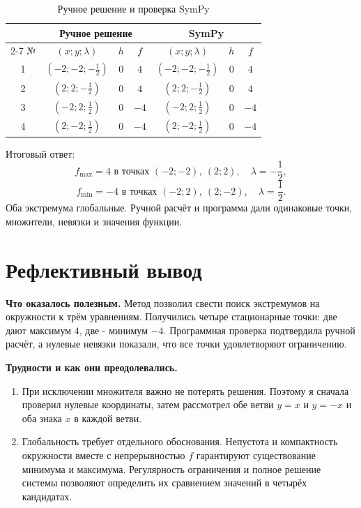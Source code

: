\documentclass[a4paper,12pt]{article}
\begin{document}
\begin{table}[H]
\centering
\caption{Ручное решение и проверка SymPy}
\label{tab:comparison}
\begin{tabular}{|c|c|c|c|c|c|c|}
\hline
 & \multicolumn{3}{c|}{Ручное решение} & \multicolumn{3}{c|}{SymPy}\\ \cline{2-7}
№ & $(x;y;\lambda)$ & $h$ & $f$ & $(x;y;\lambda)$ & $h$ & $f$\\ \hline
1 & $\left(-2;-2;-\frac12\right)$ & $0$ & $4$ & $\left(-2;-2;-\frac12\right)$ & $0$ & $4$\\ \hline
2 & $\left(2;2;-\frac12\right)$ & $0$ & $4$ & $\left(2;2;-\frac12\right)$ & $0$ & $4$\\ \hline
3 & $\left(-2;2;\frac12\right)$ & $0$ & $-4$ & $\left(-2;2;\frac12\right)$ & $0$ & $-4$\\ \hline
4 & $\left(2;-2;\frac12\right)$ & $0$ & $-4$ & $\left(2;-2;\frac12\right)$ & $0$ & $-4$\\ \hline
\end{tabular}
\end{table}

Итоговый ответ:
\[
\boxed{f_{\max}=4\text{ в точках }(-2;-2),\ (2;2),\quad \lambda=-\frac12,}
\]
\[
\boxed{f_{\min}=-4\text{ в точках }(-2;2),\ (2;-2),\quad \lambda=\frac12.}
\]
Оба экстремума глобальные. Ручной расчёт и программа дали одинаковые точки, множители, невязки и значения функции.

\section{Рефлективный вывод}

\textbf{Что оказалось полезным.} Метод позволил свести поиск экстремумов на окружности к трём уравнениям. Получились четыре стационарные точки: две дают максимум $4$, две - минимум $-4$. Программная проверка подтвердила ручной расчёт, а нулевые невязки показали, что все точки удовлетворяют ограничению.

\textbf{Трудности и как они преодолевались.}
\begin{enumerate}
\item При исключении множителя важно не потерять решения. Поэтому я сначала проверил нулевые координаты, затем рассмотрел обе ветви $y=x$ и $y=-x$ и оба знака $x$ в каждой ветви.
\item Глобальность требует отдельного обоснования. Непустота и компактность окружности вместе с непрерывностью $f$ гарантируют существование минимума и максимума. Регулярность ограничения и полное решение системы позволяют определить их сравнением значений в четырёх кандидатах.
\end{enumerate}
\end{document}

